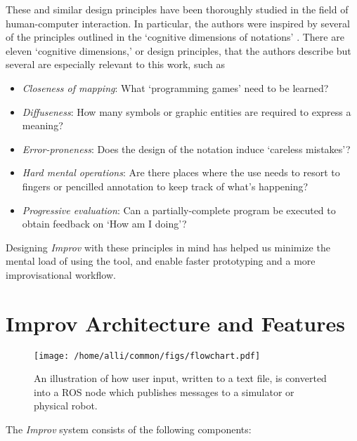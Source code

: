 \documentclass[sigconf]{acmart}
\begin{document}
These and similar design principles have been thoroughly studied in the field
of human-computer interaction. In particular, the authors were inspired by several of the principles
outlined in the `cognitive dimensions of notations' \cite{green1996usability}.
There are eleven `cognitive dimensions,' or design principles, that the authors
describe but several are especially relevant to this work, such as

\begin{itemize}
\item \emph{Closeness of mapping}: What `programming games' need to be learned?
\item \emph{Diffuseness}: How many symbols or graphic entities are required to express a meaning?
\item \emph{Error-proneness}: Does the design of the notation induce `careless mistakes'?
\item \emph{Hard mental operations}: Are there places where the use needs to resort to  fingers or pencilled annotation to keep track of what's happening?
\item \emph{Progressive evaluation}: Can a partially-complete program be executed to
obtain feedback on `How am I doing'?
\end{itemize}

Designing \emph{Improv} with these principles in mind has helped us minimize the mental
load of using the tool, and enable faster prototyping and a more
improvisational workflow.

\section{Improv Architecture and Features}\label{architecture-overview}

\begin{figure}[h]
\centering
\texttt{[image: /home/alli/common/figs/flowchart.pdf]}
\caption{An illustration of how user input, written to a text file, is
converted into a ROS node which publishes messages to a simulator or physical 
robot.
\label{flowchart}}
\end{figure}

The \emph{Improv} system consists of the following components:
\end{document}
